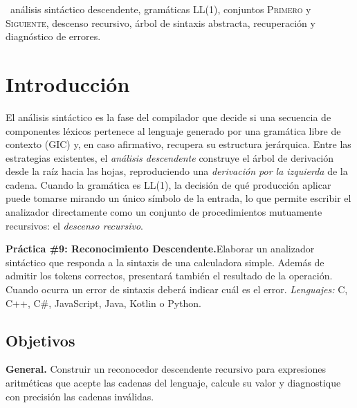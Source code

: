 \documentclass[11pt,a4paper]{article}
\newcommand{\PRIMERO}{\textsc{Primero}}
\newcommand{\SIGUIENTE}{\textsc{Siguiente}}
\begin{document}
\medskip
{}\ {\small análisis sintáctico descendente,
gramáticas LL(1), conjuntos \PRIMERO{} y \SIGUIENTE{}, descenso recursivo, árbol de sintaxis abstracta,
recuperación y diagnóstico de errores.}

\newpage
\thispagestyle{empty}
{\hypersetup{linkcolor=tinta}
\renewcommand{\contentsname}{\sffamily\large Contenido}
\setcounter{tocdepth}{2}
\tableofcontents}
\newpage

\section{Introducción}

El análisis sintáctico es la fase del compilador que decide si una secuencia de componentes léxicos
pertenece al lenguaje generado por una gramática libre de contexto (GIC) y, en caso afirmativo, recupera
su estructura jerárquica. Entre las estrategias existentes, el \emph{análisis descendente} construye el
árbol de derivación desde la raíz hacia las hojas, reproduciendo una \emph{derivación por la izquierda}
de la cadena. Cuando la gramática es \textsc{LL(1)}, la decisión de qué producción aplicar puede tomarse
mirando un único símbolo de la entrada, lo que permite escribir el analizador directamente como un
conjunto de procedimientos mutuamente recursivos: el \emph{descenso recursivo}.

\begin{enunciado}
\textbf{Práctica \#9: Reconocimiento Descendente.}\quad Elaborar un analizador sintáctico que responda a la
sintaxis de una calculadora simple. Además de admitir los tokens correctos, presentará también el
resultado de la operación. Cuando ocurra un error de sintaxis deberá indicar cuál es el error.
\emph{Lenguajes:} C, C++, C\#, JavaScript, Java, Kotlin o Python.
\end{enunciado}

\subsection{Objetivos}

\textbf{General.}\; Construir un reconocedor descendente recursivo para expresiones aritméticas que
acepte las cadenas del lenguaje, calcule su valor y diagnostique con precisión las cadenas inválidas.
\end{document}
